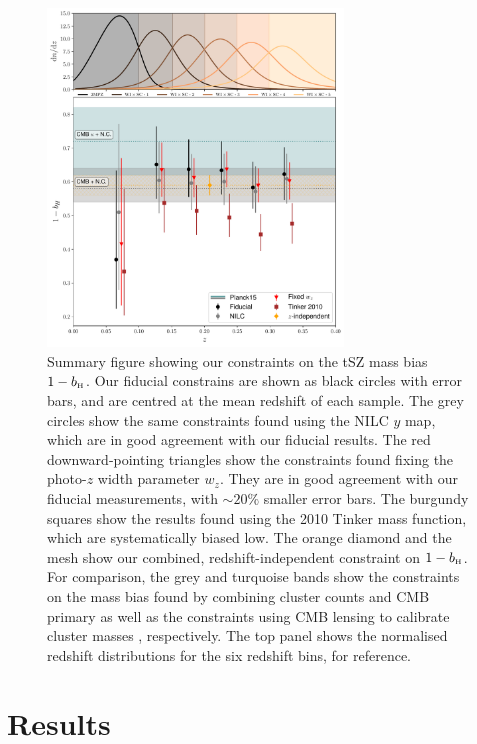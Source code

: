\documentclass[useAMS,usenatbib]{mn2e}
\def\bH{b_{\scriptscriptstyle\rm H}}
\begin{document}
      \begin{figure}
        \centering
        \includegraphics[width=0.7\textwidth]{bhydro.pdf}
        \caption{Summary figure showing our constraints on the tSZ mass bias $1-\bH$. Our fiducial constrains are shown as black circles with error bars, and are centred at the mean redshift of each sample. The grey circles show the same constraints found using the NILC $y$ map, which are in good agreement with our fiducial results. The red downward-pointing triangles show the constraints found fixing the photo-$z$ width parameter $w_z$. They are in good agreement with our fiducial measurements, with $\sim20\%$ smaller error bars. The burgundy squares show the results found using the 2010 Tinker mass function, which are systematically biased low. The orange diamond and the mesh show our combined, redshift-independent constraint on $1-\bH$. For comparison, the grey and turquoise bands show the constraints on the mass bias found by combining cluster counts and CMB primary \citep{2016A&A...594A..24P} as well as the constraints using CMB lensing to calibrate cluster masses \citep{2019arXiv190407887Z}, respectively. The top panel shows the normalised redshift distributions for the six redshift bins, for reference.}
        \label{fig:bh}
      \end{figure}




\section{Results}\label{sec:results}
\end{document}
